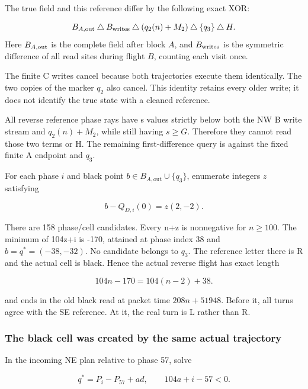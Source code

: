 The true field and this reference differ by the following exact XOR:

\begin{equation}\label{eq:rt42}
B_{A,\rm out}\mathbin{\triangle}B_{\rm writes}\mathbin{\triangle}(q_2(n)+M_2)\mathbin{\triangle}\{q_3\}\mathbin{\triangle}H.
\end{equation}
Here $B_{A,\rm out}$ is the complete field after block $A$, and
$B_{\rm writes}$ is the symmetric difference of all read sites during flight
$B$, counting each visit once.


The finite C writes cancel because both trajectories execute them
identically. The two copies of the marker $q_2$ also cancel. This identity
retains every older write; it does not identify the true state with a
cleaned reference.

All reverse reference phase rays have s values strictly below both the
NW B write stream and $q_2(n)+M_2$, while still having $s\ge G$.
Therefore they cannot read those two terms or H. The remaining
first-difference query is against the fixed finite A endpoint and $q_3$.

For each phase $i$ and black point $b\in B_{A,\mathrm{out}}\cup\{q_3\}$,
enumerate integers $z$ satisfying

\[
b-Q_{D,i}(0)=z(2,-2).
\]

There are 158 phase/cell candidates. Every n+z is nonnegative for
$n\ge100$. The minimum of 104z+i is -170, attained at phase
index 38 and $b=q^*=(-38,-32)$. No candidate belongs to $q_3$. The reference
letter there is R and the actual cell is black. Hence the actual reverse
flight has exact length

\begin{equation}\label{eq:rt43}
104n-170=104(n-2)+38.
\end{equation}

and ends in the old black read at packet time $208n+51948$. Before it, all
turns agree with the SE reference. At it, the real turn is L rather than
R.

\subsubsection{The black cell was created by the same actual
trajectory}\label{the-black-cell-was-created-by-the-same-actual-trajectory}

In the incoming NE plan relative to phase 57, solve

\[
q^*=P_i-P_{57}+ad,\qquad104a+i-57<0.
\]

